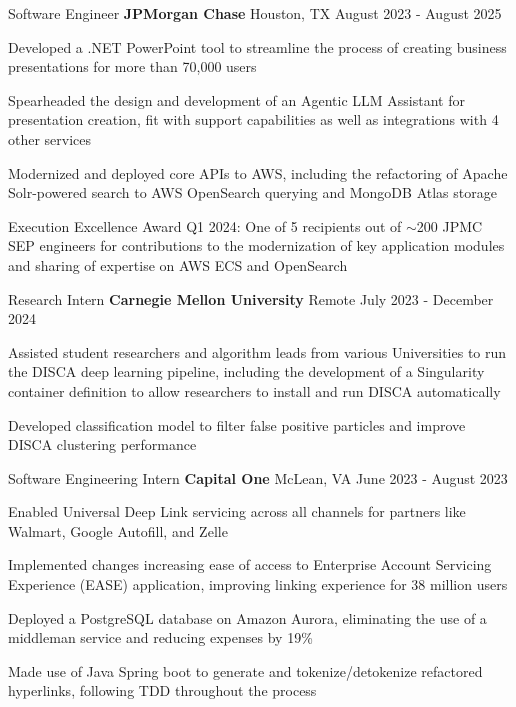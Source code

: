 
\begin{cventries}
  \cventry
    {Software Engineer}
    {\textbf{JPMorgan Chase}}
    {Houston, TX}
    {August 2023 - August 2025}
    {
      \begin{cvitems}
        \item{Developed a .NET PowerPoint tool to streamline the process of creating business presentations for more than 70,000 users}
        \item{Spearheaded the design and development of an Agentic LLM Assistant for presentation creation, fit with support capabilities as well as integrations with 4 other services}
        \item{Modernized and deployed core APIs to AWS, including the refactoring of Apache Solr-powered search to AWS OpenSearch querying and MongoDB Atlas storage}
        \item{Execution Excellence Award Q1 2024: One of 5 recipients out of $\sim$200 JPMC SEP engineers for contributions to the modernization of key application modules and sharing of expertise on AWS ECS and OpenSearch}
      \end{cvitems}
    }

  \cventry
    {Research Intern}
    {\textbf{Carnegie Mellon University}}
    {Remote}
    {July 2023 - December 2024}
    {
      \begin{cvitems}
        \item{Assisted student researchers and algorithm leads from various Universities to run the DISCA deep learning pipeline, including the development of a Singularity container definition to allow researchers to install and run DISCA automatically}
        \item{Developed classification model to filter false positive particles and improve DISCA clustering performance}
      \end{cvitems}
    }

  \cventry
    {Software Engineering Intern}
    {\textbf{Capital One}}
    {McLean, VA}
    {June 2023 - August 2023}
    {
      \begin{cvitems}
        \item{Enabled Universal Deep Link servicing across all channels for partners like Walmart, Google Autofill, and Zelle}
        \item{Implemented changes increasing ease of access to Enterprise Account Servicing Experience (EASE) application, improving linking experience for 38 million users}
        \item{Deployed a PostgreSQL database on Amazon Aurora, eliminating the use of a middleman service and reducing expenses by 19\%}
        \item{Made use of Java Spring boot to generate and tokenize/detokenize refactored hyperlinks, following TDD throughout the process}
      \end{cvitems}
    }


\end{cventries}
